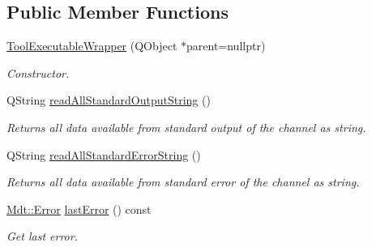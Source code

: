 \subsection*{Public Member Functions}
\begin{DoxyCompactItemize}
\item 
\hyperlink{class_mdt_1_1_deploy_utils_1_1_tool_executable_wrapper_a185d5724b1615df610d30e35070cb414}{Tool\+Executable\+Wrapper} (Q\+Object $\ast$parent=nullptr)
\begin{DoxyCompactList}\small\item\em Constructor. \end{DoxyCompactList}\item 
Q\+String \hyperlink{class_mdt_1_1_deploy_utils_1_1_tool_executable_wrapper_a16c605f652c0ce1df320abc514baa285}{read\+All\+Standard\+Output\+String} ()
\begin{DoxyCompactList}\small\item\em Returns all data available from standard output of the channel as string. \end{DoxyCompactList}\item 
Q\+String \hyperlink{class_mdt_1_1_deploy_utils_1_1_tool_executable_wrapper_a4642cfbc69f58af32dc69b4c4619c002}{read\+All\+Standard\+Error\+String} ()
\begin{DoxyCompactList}\small\item\em Returns all data available from standard error of the channel as string. \end{DoxyCompactList}\item 
\hyperlink{class_mdt_1_1_error}{Mdt\+::\+Error} \hyperlink{class_mdt_1_1_deploy_utils_1_1_tool_executable_wrapper_a9289a5137a237600e869e077b97259a8}{last\+Error} () const 
\begin{DoxyCompactList}\small\item\em Get last error. \end{DoxyCompactList}\end{DoxyCompactItemize}
